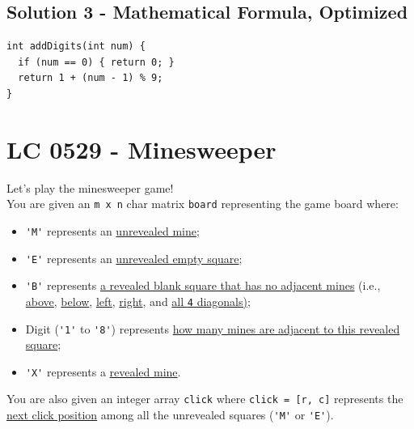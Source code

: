 \subsection*{Solution 3 - Mathematical Formula, Optimized}\label{solution:lc0258_mathematical_formula_optimized}
\begin{lstlisting}
int addDigits(int num) {
  if (num == 0) { return 0; }
  return 1 + (num - 1) % 9;
}
\end{lstlisting}

\section{LC 0529 - Minesweeper}
Let's play the minesweeper game!\\

You are given an {\colorbox{CodeBackground}{\lstinline|m x n|}} char matrix {\colorbox{CodeBackground}{\lstinline|board|}} representing the game board where:
\begin{itemize}
\item {\colorbox{CodeBackground}{\lstinline|'M'|}} represents an \ul{unrevealed mine};
\item {\colorbox{CodeBackground}{\lstinline|'E'|}} represents an \ul{unrevealed empty square};
\item {\colorbox{CodeBackground}{\lstinline|'B'|}} represents \ul{a revealed blank square that has no adjacent mines} (i.e., \ul{above}, \ul{below}, \ul{left}, \ul{right}, and \ul{all {\colorbox{CodeBackground}{\lstinline|4|}} diagonals)};
\item Digit ({\colorbox{CodeBackground}{\lstinline|'1'|}} to {\colorbox{CodeBackground}{\lstinline|'8'|}}) represents \ul{how many mines are adjacent to this revealed square};
\item {\colorbox{CodeBackground}{\lstinline|'X'|}} represents a \ul{revealed mine}.
\end{itemize}

You are also given an integer array {\colorbox{CodeBackground}{\lstinline|click|}} where {\colorbox{CodeBackground}{\lstinline|click = [r, c]|}} represents the \ul{next click position} among all the unrevealed squares ({\colorbox{CodeBackground}{\lstinline|'M'|}} or {\colorbox{CodeBackground}{\lstinline|'E'|}}).\\

